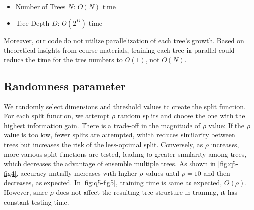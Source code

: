 \begin{itemize}
	\item Number of Trees $N$: $O(N)$ time
	\item Tree Depth $D$: $O(2^D)$ time
\end{itemize}
Moreover, our code do not utilize parallelization of each tree's growth. Based on theoretical insights from course materials, training each tree in parallel could reduce the time for the tree numbers to $O(1)$, not $O(N)$.

\subsection{Randomness parameter}
We randomly select dimensions and threshold values to create the split function. For each split function, we attempt $\rho$ random splits and choose the one with the highest information gain. There is a trade-off in the magnitude of $\rho$ value: If the $\rho$ value is too low, fewer splits are attempted, which reduces similarity between trees but increases the risk of the less-optimal split. Conversely, as $\rho$ increases, more various split functions are tested, leading to greater similarity among trees, which decreases the advantage of ensemble multiple trees. As shown in \cref{fig:q5-fig4}, accuracy initially increases with higher $\rho$ values until $\rho=10$ and then decreases, as expected. In \cref{fig:q5-fig5}, training time is same as expected, $O(\rho)$. However, since $\rho$ does not affect the resulting tree structure in training, it has constant testing time.

